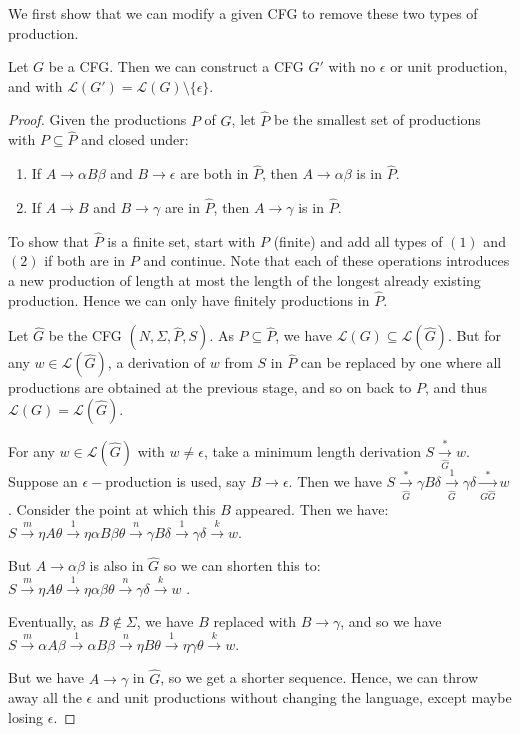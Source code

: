 \documentclass[10pt,a4paper]{article}
\begin{document}
We first show that we can modify a given CFG to remove these two types of production. 
\begin{theorem}
Let $G$ be a CFG. Then we can construct a CFG $G'$ with no $\epsilon$ or unit production, and with $\mathcal{L}(G') = \mathcal{L}(G) \setminus \{\epsilon\}$.
\end{theorem}
\begin{proof}
Given the productions $P$ of $G$, let $\hat{P}$ be the smallest set of productions with $P \subseteq \hat{P}$ and closed under:
\begin{enumerate}
\item If $A \to \alpha B\beta$ and $B \to \epsilon$ are both in $\hat{P}$, then $A \to \alpha\beta$ is in $\hat{P}$.
\item If $A \to B$ and $B \to \gamma$ are in $\hat{P}$, then $A \to \gamma$ is in $\hat{P}$.
\end{enumerate}
To show that $\hat{P}$ is a finite set, start with $P$ (finite) and add all types of $(1)$ and $(2)$ if both are in $P$ and continue. Note that each of these operations introduces a new production of length at most the length of the longest already existing production. Hence we can only have finitely productions in $\hat{P}$.

Let $\hat{G}$ be the CFG $(N, \Sigma, \hat{P}, S)$. As $P \subseteq \hat{P}$, we have $\mathcal{L}(G) \subseteq \mathcal{L}(\hat{G})$. But for any $w \in \mathcal{L}(\hat{G})$, a derivation of $w$ from $S$ in $\hat{P}$ can be replaced by one where all productions are obtained at the previous stage, and so on back to $P$, and thus $\mathcal{L}(G) = \mathcal{L}(\hat{G})$.

For any $w \in \mathcal{L}(\hat{G})$ with $w \neq \epsilon$, take a minimum length derivation $S \xrightarrow[\hat{G}]{\ast}w$. Suppose an $\epsilon-$production is used, say $B\to \epsilon$. Then we have $S \xrightarrow[\hat{G}]{\ast}\gamma B\delta\xrightarrow[\hat{G}]{1}\gamma \delta \xrightarrow[G\hat{G}]{\ast}w$. Consider the point at which this $B$ appeared. Then we have:\\
$S \xrightarrow{m}\eta A \theta \xrightarrow{1} \eta\alpha B \beta \theta \xrightarrow{n} \gamma B \delta \xrightarrow{1}\gamma \delta \xrightarrow{k} w$.

But $A \to \alpha\beta$ is also in $\hat{G}$ so we can shorten this to:\\
$S \xrightarrow{m} \eta A \theta \xrightarrow{1} \eta \alpha \beta \theta \xrightarrow{n} \gamma \delta \xrightarrow{k} w$ \contr. 

Eventually, as $B \notin \Sigma$, we have $B$ replaced with $B \to \gamma$, and so we have $S \xrightarrow{m}\alpha A \beta \xrightarrow{1} \alpha B \beta \xrightarrow{n}\eta B \theta \xrightarrow{1} \eta \gamma \theta \xrightarrow{k} w$.

But we have $A \to \gamma$ in $\hat{G}$, so we get a shorter sequence. Hence, we can throw away all the $\epsilon$ and unit productions without changing the language, except maybe losing $\epsilon$.
\end{proof}
\end{document}
